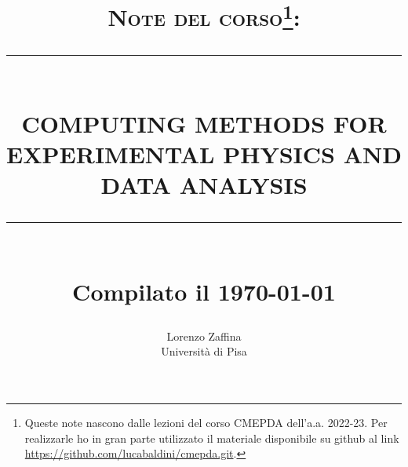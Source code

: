 \documentclass[10pt,a4paper,hidelinks]{book}
\newcommand{\HRule}[1]{\rule{\linewidth}{#1}}
\begin{document}
\title{ \normalsize \textsc{Note del corso\footnote{Queste note nascono dalle lezioni del corso CMEPDA dell'a.a. 2022-23. Per realizzarle ho in gran parte utilizzato il materiale disponibile su github al link \url{https://github.com/lucabaldini/cmepda.git}.}:}
		\\ [0.2cm]
		\HRule{0.5pt} \\
		\LARGE \textbf{\uppercase{Computing Methods for Experimental Physics and Data Analysis}}
		\HRule{2pt} \\ [0.5cm]
		\normalsize Compilato il \today \vspace*{5\baselineskip}}

\date{}

\author{
		Lorenzo Zaffina \\  [0.8cm]
		Università di Pisa \\ }

\maketitle

\tableofcontents






\appendix


\end{document}
